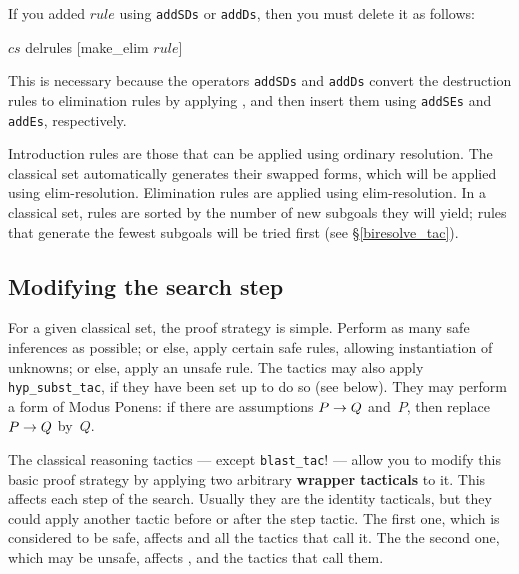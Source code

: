 \begin{warn}
  If you added $rule$ using {\tt addSDs} or {\tt addDs}, then you must delete
  it as follows:
\begin{ttbox}
\(cs\) delrules [make_elim \(rule\)]
\end{ttbox}
\par\noindent
This is necessary because the operators {\tt addSDs} and {\tt addDs} convert
the destruction rules to elimination rules by applying ,
and then insert them using {\tt addSEs} and {\tt addEs}, respectively.
\end{warn}

Introduction rules are those that can be applied using ordinary resolution.
The classical set automatically generates their swapped forms, which will
be applied using elim-resolution.  Elimination rules are applied using
elim-resolution.  In a classical set, rules are sorted by the number of new
subgoals they will yield; rules that generate the fewest subgoals will be
tried first (see \S\ref{biresolve_tac}).


\subsection{Modifying the search step}
For a given classical set, the proof strategy is simple.  Perform as many
safe inferences as possible; or else, apply certain safe rules, allowing
instantiation of unknowns; or else, apply an unsafe rule.  The tactics may
also apply {\tt hyp_subst_tac}, if they have been set up to do so (see
below).  They may perform a form of Modus Ponens: if there are assumptions
$P\rightarrow Q$ and~$P$, then replace $P\rightarrow Q$ by~$Q$.

The classical reasoning tactics --- except {\tt blast_tac}! --- allow
you to modify this basic proof strategy by applying two arbitrary {\bf
  wrapper tacticals} to it. This affects each step of the search.
Usually they are the identity tacticals, but they could apply another
tactic before or after the step tactic. The first one, which is
considered to be safe, affects  and all the
tactics that call it. The the second one, which may be unsafe, affects
,  and the tactics that call
them.

